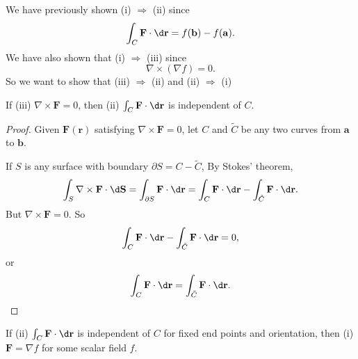 \documentclass[a4paper]{article}
\begin{document}
We have previously shown (i) $\Rightarrow$ (ii) since
\[
  \int_C \mathbf{F}\cdot \d \mathbf{r} = f(\mathbf{b}) - f(\mathbf{a}).
\]
We have also shown that (i) $\Rightarrow$ (iii) since
\[
  \nabla \times (\nabla f) = 0.
\]
So we want to show that (iii) $\Rightarrow $ (ii) and (ii) $\Rightarrow $ (i)
\begin{prop}
  If (iii) $\nabla\times \mathbf{F}= 0 $, then (ii) $\int_C \mathbf{F}\cdot \d \mathbf{r}$ is independent of $C$.
\end{prop}

\begin{proof}
  Given $\mathbf{F}(\mathbf{r})$ satisfying $\nabla\times \mathbf{F} = 0$, let $C$ and $\tilde C$ be any two curves from $\mathbf{a}$ to $\mathbf{b}$.
  \begin{center}
  \end{center}
  If $S$ is any surface with boundary $\partial S = C - \tilde C$, By Stokes' theorem,
  \[
    \int_{S}\nabla \times \mathbf{F}\cdot \d \mathbf{S} = \int_{\partial S}\mathbf{F}\cdot \d \mathbf{r} = \int_C \mathbf{F}\cdot \d \mathbf{r} - \int_{\tilde{C}}\mathbf{F}\cdot \d \mathbf{r}.
  \]
  But $\nabla\times \mathbf{F} = 0$. So
  \[
    \int_C \mathbf{F}\cdot \d \mathbf{r} - \int_{\tilde{C}} \mathbf{F}\cdot \d \mathbf{r} = 0,
  \]
  or
  \[
    \int_C \mathbf{F}\cdot \d \mathbf{r} = \int_{\tilde{C}}\mathbf{F}\cdot \d \mathbf{r}.\qedhere
  \]
\end{proof}

\begin{prop}
  If (ii) $\int_C \mathbf{F}\cdot \d \mathbf{r}$ is independent of $C$ for fixed end points and orientation, then (i) $\mathbf{F} = \nabla f$ for some scalar field $f$.
\end{prop}
\end{document}

